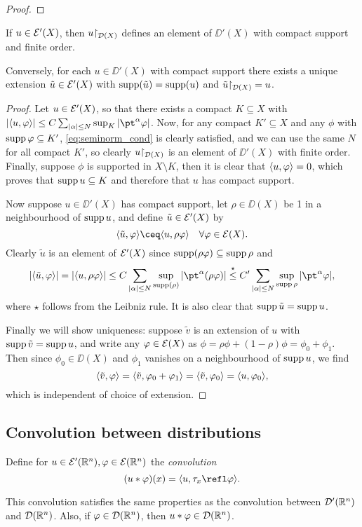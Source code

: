 \begin{proof}
	\TODO
\end{proof}

\begin{lemma}
	If $u \in \mathcal E'(X)$, then $u\mathord\restriction_{\mathcal D(X)}$ defines an element of $\DD'(X)$ with compact support and finite order. 
	
	Conversely, for each $u \in \DD'(X)$ with compact support there exists a unique extension $\tilde u \in \mathcal E'(X)$ with $\operatorname{supp}(\tilde u) = \operatorname{supp}(u)$ and $\tilde u\mathord\restriction_{\mathcal D(X)} = u$. 
\end{lemma}

\begin{proof}
	Let $u \in \mathcal E'(X)$, so that there exists a compact $K \subseteq X$ with $\abs{\ang{u, \phi}} \leq C \sum_{\abs{\alpha} \leq N} \sup_K \abs{\pt^\alpha \phi}$. 
	Now, for any compact $K' \subseteq X$ and any $\phi$ with $\operatorname{supp}\varphi \subseteq K'$, \cref{eq:seminorm_cond} is clearly satisfied, and we can use the same $N$ for all compact $K'$, so clearly $u\mathord\restriction_{\mathcal D(X)}$ is an element of $\DD'(X)$ with finite order.
	Finally, suppose $\phi$ is supported in $X \setminus K$, then it is clear that $\langle u, \varphi\rangle = 0$, which proves that $\operatorname{supp} u \subseteq K$ and therefore that $u$ has compact support.
	
	Now suppose $u \in \DD'(X)$ has compact support, let $\rho \in \DD(X)$ be 1 in a neighbourhood of $\operatorname{supp} u$, and define $\tilde u \in \mathcal E'(X)$ by
	\[
	\ang{\tilde u, \phi} \ceq \ang{u, \rho\phi} \quad\forall \phi \in \EE(X). 
	\]
	Clearly $\tilde u$ is an element of $\mathcal E'(X)$ since $\operatorname{supp}(\rho\varphi) \subseteq \operatorname{supp}\rho$ and 
	\[
	\abs{\ang{\tilde u, \phi}} = \abs{\ang{u, \rho\phi}} \leq C \sum_{\abs{\alpha} \leq N} \sup_{\supp(\rho)} \abs{\pt^\alpha(\rho \phi)} \overset\star\leq C' \sum_{\abs{\alpha} \leq N} \sup_{\supp\rho} \abs{\pt^\alpha\phi},
	\]
	where $\star$ follows from the Leibniz rule. It is also clear that $\operatorname{supp} \tilde u = \operatorname{supp} u$. 
	
	Finally we will show uniqueness: suppose $\tilde v$ is an extension of $u$ with $\operatorname{supp} \tilde v = \operatorname{supp} u$, and write any $\varphi \in \mathcal E(X)$ as $\phi = \rho\phi + (1-\rho)\phi = \phi_0 + \phi_1$. Then since $\phi_0 \in \DD(X)$ and $\phi_1$ vanishes on a neighbourhood of $\operatorname{supp} u$, we find
	\[
	\langle\tilde v, \varphi\rangle = \langle\tilde v, \varphi_0 + \varphi_1\rangle = \langle\tilde v, \varphi_0\rangle = \langle u, \varphi_0\rangle,
	\]
	which is independent of choice of extension. 
\end{proof}

\subsection{Convolution between distributions}
\begin{definition}
	Define for $u \in \mathcal E'(\mathbb R^n), \varphi \in \mathcal E(\mathbb R^n)$ the \emph{convolution}
	\[
	(u * \phi)(x) = \ang{u, \tau_x \refl\phi}. 
	\]
\end{definition}
This convolution satisfies the same properties as the convolution between $\mathcal D'(\mathbb R^n)$ and $\mathcal D(\mathbb R^n)$. 
Also, if $\varphi \in \mathcal D(\mathbb R^n)$, then $u * \varphi \in \mathcal D(\mathbb R^n)$. 

